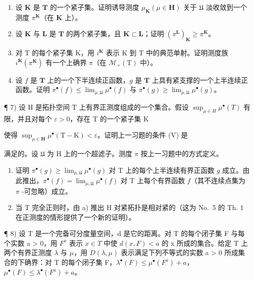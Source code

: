 \begin{enumerate}
\def\labelenumi{\alph{enumi})}
\item
  设 \(\mathbf{K}\) 是 \(\mathbf{T}\) 的一个紧子集。证明诱导测度 \(\mu_{\mathbf{K}} (\mu \in \mathbf{H})\) 关于 \(\mathfrak{U}\) 淡收敛到一个测度 \(\pi^{\mathbf{K}}\)（在 \(\mathbf{K}\) 上）。
\item
  设 \(\mathbf{K}\) 与 \(\mathbf{L}\) 是 \(\mathbf{T}\) 的两个紧子集，且 \(\mathbf{K} \subset \mathbf{L}\)；证明 \((\pi^{\mathbf{L}})_{\mathbf{K}} \geqslant \pi^{\mathbf{K}}\)。
\item
  对 T 的每个紧子集 K，用 \(i^{\mathbf{K}}\) 表示 K 到 T 中的典范单射。证明测度族 \(i^{\mathbf{K}}(\pi^{\mathbf{K}})\) 有一个上确界 \(\pi\)（在 \(\mathcal{M}_{+}(\mathrm{T})\) 中）。
\item
  设 \(f\) 是 \(\mathbf{T}\) 上的一个下半连续正函数，\(g\) 是 \(\mathbf{T}\) 上具有紧支撑的一个上半连续正函数。证明 \(\pi^{\bullet}(f) \leqslant \lim_{\mu, \mathfrak{U}} \mu^{\bullet}(f)\) 与 \(\pi^{\bullet}(g) \geqslant \lim_{\mu, \mathfrak{U}} \mu^{\bullet}(g)\)。
\end{enumerate}

¶ 7) 设 H 是拓扑空间 T 上有界正测度组成的一个集合。假设 \(\sup_{\mu\in H}\mu^{\bullet}(T)\) 有限，并且对每个 \(\varepsilon>0\)，存在 T 的一个紧子集 K

使得 \(\sup_{\mu \in \mathbf{H}}\mu^{\bullet}(\mathrm{T} - \mathrm{K}) < \varepsilon\)。证明上一习题的条件 (V) 是

满足的。设 \(\mathfrak{U}\) 为 H 上的一个超滤子。测度 \(\pi\) 按上一习题中的方式定义。

\begin{enumerate}
\def\labelenumi{\alph{enumi})}
\item
  证明 \(\pi^{\bullet}(g) \geqslant \lim_{\mu, \mathfrak{U}} \mu^{\bullet}(g)\) 对 T 上的每个上半连续有界正函数 \(g\) 成立。由此推出，\(\pi^{\bullet}(f) = \lim_{\mu, \mathfrak{U}} \mu^{\bullet}(f)\) 对 T 上每个有界函数 \(f\)（其不连续点集为 \(\pi\) -可忽略）成立。
\item
  当 T 完全正则时，由 a) 推出 H 对紧拓扑是相对紧的（这为 No.~5 的 Th. 1 在正测度的情形提供了一个新的证明）。
\end{enumerate}

¶ 8) 设 T 是一个完备可分度量空间，d 是它的距离。对 T 的每个闭子集 F 与每个实数 a > 0，用 \(F^{a}\) 表示 \(x \in T\) 中使 \(d(x, F) < a\) 的 x 所成的集合。给定 T 上两个有界正测度 \(\lambda\) 与 \(\mu\)，用 \(D(\lambda, \mu)\) 表示满足下列不等式的实数 a > 0 所成集合的下确界：对 T 的每个闭子集 F，\(\lambda^{\bullet}(F) \leqslant \mu^{\bullet}(F^{a}) + a\)，\(\mu^{\bullet}(F) \leqslant \lambda^{\bullet}(F^{a}) + a\)。

